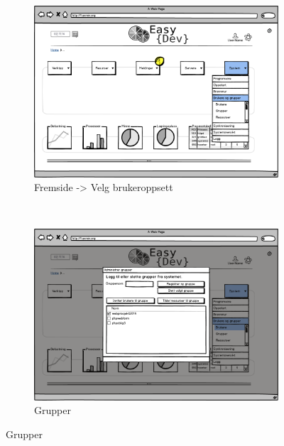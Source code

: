 \begin{figure}[p]
        \centering
        \begin{subfigure}[b]{0.48\textwidth}
                \includegraphics[width=\textwidth]
                {./img/prosessdokumentasjon/lowfi/b1.png}
                \caption{Fremside -> Velg brukeroppsett}
                \label{fig:brukere1}
        \end{subfigure}%
        ~ %
        \begin{subfigure}[b]{0.48\textwidth}
                \includegraphics[width=\textwidth]
                {./img/prosessdokumentasjon/lowfi/b2.png}
                \caption{Grupper}
                \label{fig:brukere2}
        \end{subfigure}
       

\end{figure}
